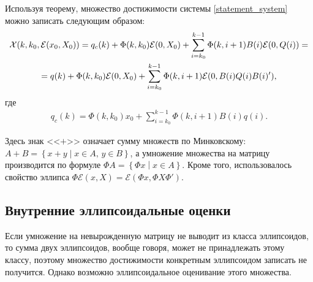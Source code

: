 \documentclass[10pt, a4paper]{article}
\renewcommand{\ell}{\mathcal{E}}
\begin{document}
\begin{imp}
	Используя теорему, множество достижимости системы \eqref{statement_system} можно записать следующим образом:
	\begin{gather}
		\notag \mathcal{X}(k,k_0,\ell(x_0,X_0)) = q_c(k) + \Phi(k,k_0)\ell(0,X_0) + 
			\sum\limits_{i=k_0}^{k-1}\Phi(k,i+1)B(i)\ell(0,Q(i)) = \\
		= q(k) + \Phi(k,k_0)\ell(0,X_0) + 
			\sum\limits_{i=k_0}^{k-1}\Phi(k,i+1)\ell(0,B(i)Q(i)B(i)'),
	\end{gather}
	где \begin{gather}\label{ellipsoids_center}
		q_c(k) = \Phi(k,k_0)x_0 + \sum\limits_{i=k_0}^{k-1}\Phi(k,i+1)B(i)q(i).
	\end{gather}
\end{imp}
Здесь знак <<$+$>> означает сумму множеств по Минковскому: $A+B= \left\{x+y \middle| x\in A,\, y\in B\right\}$, а умножение множества на матрицу производится по формуле $\Phi A = \left\{ \Phi x\middle| x\in A \right\}.$ Кроме того, использовалось свойство эллипса $\Phi\ell(x,X) = \ell(\Phi x,\Phi X\Phi')$.
\subsection{Внутренние эллипсоидальные оценки}
Если умножение на невырожденную матрицу не выводит из класса эллипсоидов, то сумма двух эллипсоидов, вообще говоря, может не принадлежать этому классу, поэтому множество достижимости конкретным эллипсоидом записать не получится. Однако возможно эллипсоидальное оценивание этого множества.
\end{document}
